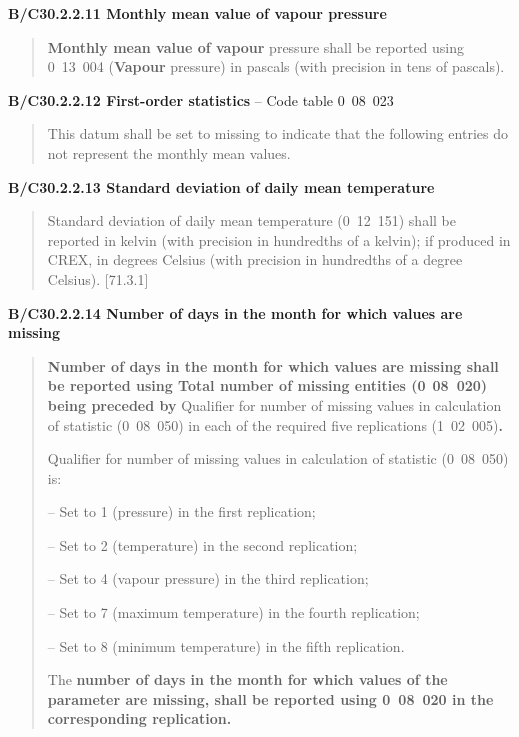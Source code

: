 \textbf{B/C30.2.2.11 Monthly mean value of vapour pressure}

\begin{quote}
\textbf{Monthly mean value of vapour} pressure shall be reported using 0~13~004 (\textbf{Vapour} pressure) in pascals (with precision in tens of pascals).
\end{quote}

\textbf{B/C30.2.2.12 First-order statistics} -- Code table 0~08~023

\begin{quote}
This datum shall be set to missing to indicate that the following entries do not represent the monthly mean values.
\end{quote}

\textbf{B/C30.2.2.13 Standard deviation of daily mean temperature}

\begin{quote}
Standard deviation of daily mean temperature (0~12~151) shall be reported in kelvin (with precision in hundredths of a kelvin); if produced in CREX, in degrees Celsius (with precision in hundredths of a degree Celsius). {[}71.3.1{]}
\end{quote}

\textbf{B/C30.2.2.14 Number of days in the month for which values are missing}

\begin{quote}
\textbf{Number of days in the month for which values are missing shall be reported using Total number of missing entities (0}~\textbf{08~020) being preceded by} Qualifier for number of missing values in calculation of statistic (0~08~050) in each of the required five replications (1~02~005)\textbf{.}

Qualifier for number of missing values in calculation of statistic (0~08~050) is:

-- Set to 1 (pressure) in the first replication;

-- Set to 2 (temperature) in the second replication;

-- Set to 4 (vapour pressure) in the third replication;

-- Set to 7 (maximum temperature) in the fourth replication;

-- Set to 8 (minimum temperature) in the fifth replication.

The \textbf{number of days in the month for which values of the parameter are missing, shall be reported using 0~08~020 in the corresponding replication.}
\end{quote}

